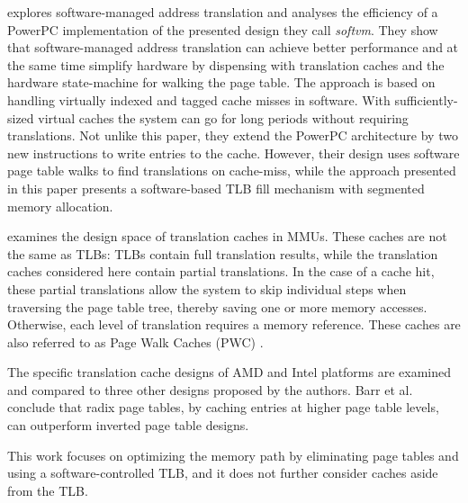 \textbf{\cite{jacobSoftwaremanagedAddressTranslation1997}} explores software-managed address translation and analyses the efficiency of a PowerPC implementation
of the presented design they call \textit{softvm}. They show that
software-managed address translation can achieve better performance and
at the same time simplify hardware by dispensing with translation caches and
the hardware state-machine for walking the page table.
The approach is based on handling virtually indexed and tagged cache misses in
software.
With sufficiently-sized virtual caches the system can go for long periods
without requiring translations.
Not unlike this paper, they extend the PowerPC architecture by two new instructions
to write entries to the cache. However, their design uses software page table
walks to find translations on cache-miss, while the approach presented in this
paper presents a software-based TLB fill mechanism with segmented
memory allocation.


\textbf{\cite{barrTranslationCachingSkip}} examines the design space of translation caches in MMUs. These caches are not the same as TLBs: TLBs contain full translation results, while the translation caches considered here contain partial translations. In the case of a cache hit, these partial translations allow the system to skip individual steps when traversing the page table tree, thereby saving one or more memory accesses. Otherwise, each level of translation requires a memory reference. These caches are also referred to as Page Walk Caches (PWC) \cite{yaniv2016hash}.

The specific translation cache designs of AMD and Intel platforms are examined and compared to three other designs proposed by the authors. Barr et al. conclude that radix page tables, by caching entries at higher page table levels, can outperform inverted page table designs.

This work focuses on optimizing the memory path by eliminating page tables and using a software-controlled TLB, and it does not further consider caches aside from the TLB.




